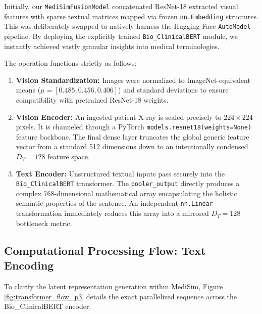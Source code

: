 \documentclass[11pt,a4paper]{article}
\begin{document}
Initially, our \texttt{MediSimFusionModel} concatenated ResNet-18 extracted visual features with sparse textual matrices mapped via frozen \texttt{nn.Embedding} structures. This was deliberately swapped to natively harness the Hugging Face \texttt{AutoModel} pipeline. By deploying the explicitly trained \texttt{Bio\_ClinicalBERT} module, we instantly achieved vastly granular insights into medical terminologies.

The operation functions strictly as follows:
\begin{enumerate}
    \item \textbf{Vision Standardization:} Images were normalized to ImageNet-equivalent means ($\mu=[0.485, 0.456, 0.406]$) and standard deviations to ensure compatibility with pretrained ResNet-18 weights.
    \item \textbf{Vision Encoder:} An ingested patient X-ray is scaled precisely to $224 \times 224$ pixels. It is channeled through a PyTorch \texttt{models.resnet18(weights=None)} feature backbone. The final dense layer truncates the global generic feature vector from a standard 512 dimensions down to an intentionally condensed $D_V = 128$ feature space.
    \item \textbf{Text Encoder:} Unstructured textual inputs pass securely into the \texttt{Bio\_ClinicalBERT} transformer. The \texttt{pooler\_output} directly produces a complex 768-dimensional mathematical array encapsulating the holistic semantic properties of the sentence. An independent \texttt{nn.Linear} transformation immediately reduces this array into a mirrored $D_T = 128$ bottleneck metric. 
\end{enumerate}

\subsection{Computational Processing Flow: Text Encoding}
To clarify the latent representation generation within MediSim, Figure \ref{fig:transformer_flow_p3} details the exact parallelized sequence across the Bio\_ClinicalBERT encoder.
\end{document}
